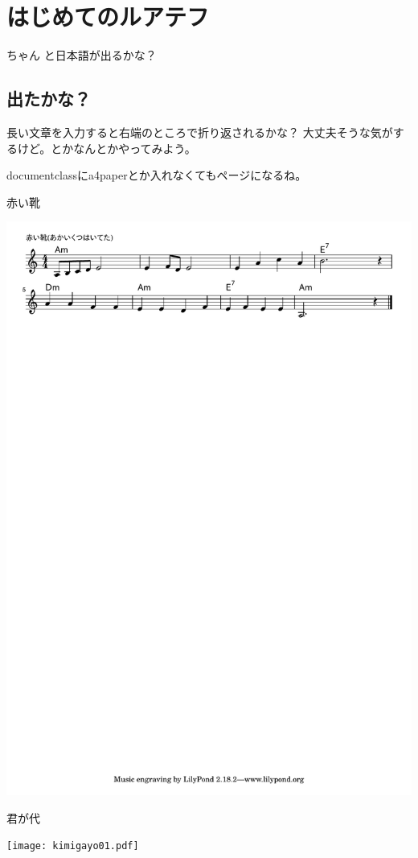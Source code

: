 \documentclass[]{ltjsarticle}
\begin{document}
\section{はじめてのルアテフ}
ちゃん  と日本語が出るかな？
\subsection{出たかな？}
長い文章を入力すると右端のところで折り返されるかな？
大丈夫そうな気がするけど。とかなんとかやってみよう。

documentclassにa4paperとか入れなくてもページになるね。

赤い靴

\includegraphics[viewport=15 700 300 830]{akaikutsu.pdf}

君が代

\texttt{[image: kimigayo01.pdf]}\\
\\
\end{document}
